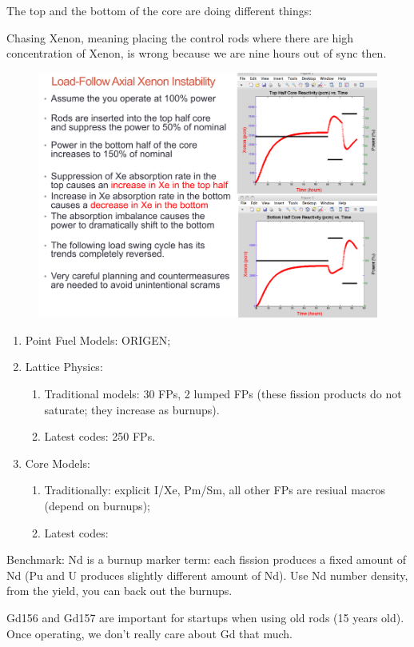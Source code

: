 \documentclass{school-22.211-notes}
\begin{document}
\clearpage
{}
The top and the bottom of the core are doing different things: 

Chasing Xenon, meaning placing the control rods where there are high concentration of Xenon, is wrong because we are nine hours out of sync then. 
\begin{figure}[ht]
  \centering
  \includegraphics[width=5in]{images/dfs/axial-xenon-instability.png}
\end{figure}

\clearpage
{}
\begin{enumerate}
\item Point Fuel Models: ORIGEN;
\item Lattice Physics: 
  \begin{enumerate}
    \item Traditional models: 30 FPs, 2 lumped FPs (these fission products do not saturate; they increase as burnups).
    \item Latest codes: 250 FPs. 
  \end{enumerate}
\item Core Models: 
  \begin{enumerate}
    \item Traditionally: explicit I/Xe, Pm/Sm, all other FPs are resiual macros (depend on burnups);
    \item Latest codes: 
  \end{enumerate}
\end{enumerate}

Benchmark: Nd is a burnup marker term: each fission produces a fixed amount of Nd (Pu and U produces slightly different amount of Nd). Use Nd number density, from the yield, you can back out the burnups. 

Gd156 and Gd157 are important for startups when using old rods (15 years old). Once operating, we don't really care about Gd that much. 
\end{document}
